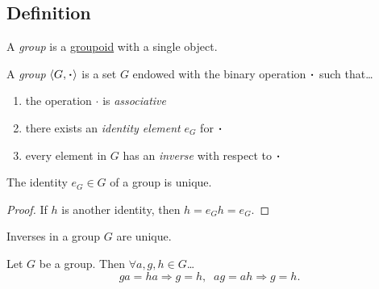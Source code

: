 \subsection{Definition}\label{groupdefinition}

A \emph{group} is a \hyperref[groupoid]{groupoid} with a single object.\newline

\noindent A \emph{group} $\langle G, \LargerCdot \rangle$ is a set $G$ endowed with the binary operation $\LargerCdot$ such that\dots
\begin{enumerate}
  \item the operation $\cdot$ is \emph{associative}
  \item there exists an \emph{identity element} $e_G$ for $\LargerCdot$
  \item every element in $G$ has an \emph{inverse} with respect to $\LargerCdot$
\end{enumerate}

\begin{proposition}
The identity $e_G \in G$ of a group is unique.
\end{proposition}

\begin{proof}
If $h$ is another identity, then $h = e_Gh = e_G$.
\end{proof}

\begin{proposition}
Inverses in a group $G$ are unique.
\end{proposition}

\begin{proposition}[Cancellation]\label{cancellation}
Let $G$ be a group. Then $\forall a,g,h \in G$\dots
$$ga = ha \Rightarrow g = h, \; \; ag = ah \Rightarrow g = h.$$
\end{proposition}